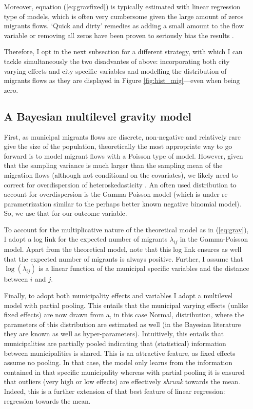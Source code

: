 \documentclass[fleqn,10pt]{SelfArx} %
\begin{document}
Moreover, equation (\ref{eq:gravfixed}) is typically estimated with linear
regression type of models, which is often very cumbersome given the large amount
of zeros migrants flows. `Quick and dirty' remedies as adding a small amount to
the flow variable or removing all zeros have been proven to seriously bias the
results \citep{linders2006estimation, burger2009specification}.

Therefore, I opt in the next subsection for a different strategy, with which I
can tackle simultaneously the two disadvantes of above: incorporating both city
varying effects and city specific variables and modelling the distribution of
migrants flows as they are displayed in Figure \ref{fig:hist_mig}---even when
being zero.

\subsection{A Bayesian multilevel gravity model}

First, as municipal migrants flows are discrete, non-negative and relatively
rare give the size of the population, theoretically the most appropriate way to
go forward is to model migrant flows with a Poisson type of model. However,
given that the sampling variance is much larger than the sampling mean of the
migration flows (although not conditional on the covariates), we likely need to
correct for overdispersion of heteroskedasticity \citep[][states that
heteroskedasticity (rather than the presence of too many zeros) is responsible
for the main source of bias within gravity models.]{silva2006log}. An often used
distribution to account for overdispersion is the Gamma-Poisson model (which is
under re-parametrization similar to the perhaps better known negative binomial
model). So, we use that for our outcome variable.

To account for the multiplicative nature of the theoretical model as in
(\ref{eq:grav}), I adopt a log link for the expected number of migrants
$\lambda_{ij}$ in the Gamma-Poisson model. Apart from the theoretical model,
note that this log link ensures as well that the expected number of migrants is
always positive. Further, I assume that $\log(\lambda_{ij})$ is a linear
function of the municipal specific variables and the distance between $i$ and
$j$.

Finally, to adopt both municipality effects and variables I adopt a multilevel
model with partial pooling. This entails that the municipal varying effects
(unlike fixed effects) are now drawn from a, in this case Normal, distribution,
where the parameters of this distribution are estimated as well (in the Bayesian
literature they are known as well as hyper-parameters). Intuitively, this
entails that municipalities are partially pooled indicating that (statistical)
information between municipalities is shared. This is an attractive feature, as
fixed effects assume no pooling. In that case, the model only learns from the
information contained in that specific municipality whereas with partial pooling
it is ensured that outliers (very high or low effects) are effectively
\emph{shrunk} towards the mean. Indeed, this is a further extension of that best
feature of linear regression: regression towards the mean.
\end{document}
